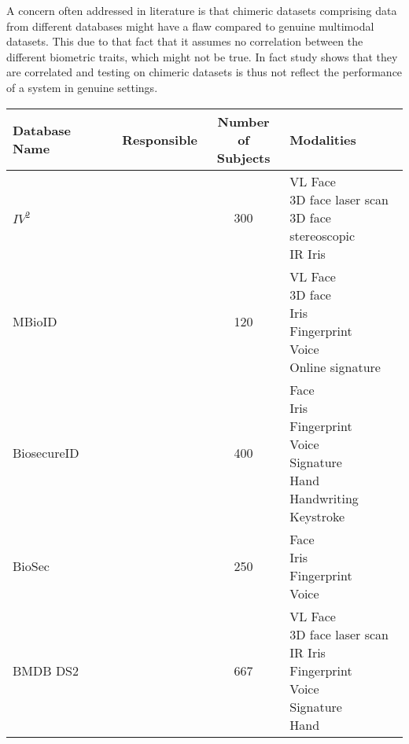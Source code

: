 A concern often addressed in literature is that chimeric datasets comprising data from different databases might have a flaw compared to genuine multimodal datasets. This due to that fact that it assumes no correlation between the different biometric traits, which might not be true. In fact study shows that they are correlated and testing on chimeric datasets is thus not reflect the performance of a system in genuine settings\citep{Al-Waisy2017a}.    

\begin{table}[H]
\centering
\begin{tabularx}{1.2\textwidth}{ XccX }
\hline
\rowcolor{Grey}
\textbf{Database Name}&\textbf{Responsible}&\makecell{\textbf{Number of} \\ \textbf{Subjects}}&\textbf{Modalities}\\
\hline
$IV^2$&\cite{Petrovska-Delacretaz2008a}&300&\makecell{VL Face\\3D face laser scan\\ 3D face stereoscopic\\IR Iris}\\
\hline
\rowcolor{lightGrey}
MBioID&\cite{Dessimoz2007}&120&\makecell{VL Face\\3D face \\ Iris\\Fingerprint\\Voice\\ Online signature}\\
\hline
BiosecureID&\cite{BiosecID2008}&400&\makecell{Face\\Iris\\Fingerprint\\Voice\\Signature\\Hand\\Handwriting\\Keystroke}\\
\hline
\rowcolor{lightGrey}
BioSec&\cite{Biosec2007}&250&\makecell{Face\\ Iris\\Fingerprint\\Voice}\\
\hline
BMDB DS2&\cite{Ortega-Garcia2010}&667&\makecell{VL Face\\3D face laser scan\\ IR Iris\\Fingerprint\\Voice\\Signature\\Hand }\\

\end{tabularx}
\end{table}
